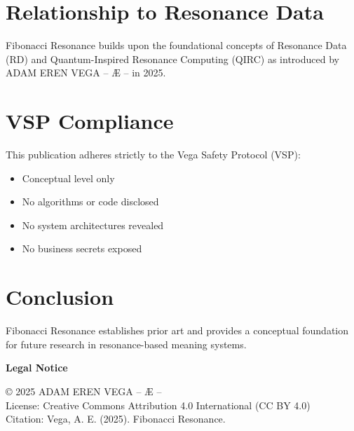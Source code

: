 \documentclass[12pt,a4paper]{article}
\begin{document}
\section{Relationship to Resonance Data}
Fibonacci Resonance builds upon the foundational concepts of Resonance Data (RD) and 
Quantum-Inspired Resonance Computing (QIRC) as introduced by ADAM EREN VEGA – Æ – in 2025.

\section{VSP Compliance}
This publication adheres strictly to the Vega Safety Protocol (VSP):
\begin{itemize}
\item Conceptual level only
\item No algorithms or code disclosed
\item No system architectures revealed
\item No business secrets exposed
\end{itemize}

\section{Conclusion}
Fibonacci Resonance establishes prior art and provides a conceptual foundation for future 
research in resonance-based meaning systems.

\vspace{1cm}
\noindent\textbf{Legal Notice}

\noindent © 2025 ADAM EREN VEGA – Æ –\\
License: Creative Commons Attribution 4.0 International (CC BY 4.0)\\
Citation: Vega, A. E. (2025). Fibonacci Resonance.
\end{document}
